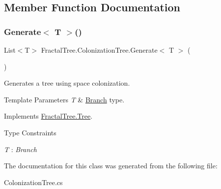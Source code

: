 \subsection{Member Function Documentation}
\hypertarget{class_fractal_tree_1_1_colonization_tree_ac16d379a8d3c2f2a56ef5e3f1c66df36}{}\label{class_fractal_tree_1_1_colonization_tree_ac16d379a8d3c2f2a56ef5e3f1c66df36} 
\subsubsection{\texorpdfstring{Generate$<$ T $>$()}{Generate< T >()}}
{\footnotesize\ttfamily List$<$T$>$ Fractal\+Tree.\+Colonization\+Tree.\+Generate$<$ T $>$ (\begin{DoxyParamCaption}{ }\end{DoxyParamCaption})}



Generates a tree using space colonization. 


\begin{DoxyTemplParams}{Template Parameters}
{\em T} & \hyperlink{interface_fractal_tree_1_1_branch}{Branch} type.\\
\hline
\end{DoxyTemplParams}


Implements \hyperlink{interface_fractal_tree_1_1_tree}{Fractal\+Tree.\+Tree}.

\begin{Desc}
\item[Type Constraints]\begin{description}
\item[{\em T} : {\em Branch}]\end{description}
\end{Desc}


The documentation for this class was generated from the following file\+:\begin{DoxyCompactItemize}
\item 
Colonization\+Tree.\+cs\end{DoxyCompactItemize}
